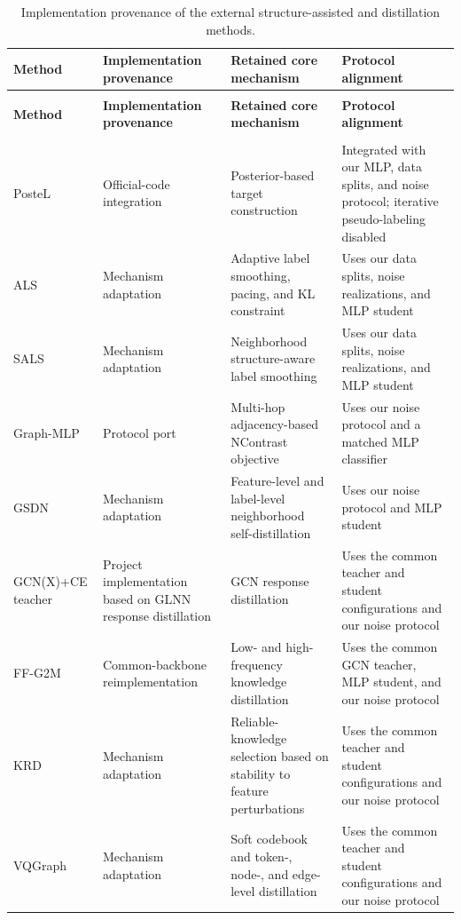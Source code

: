 \documentclass[10pt,letterpaper]{elsarticle}
\newlength{\TableWidth}
\begin{document}
\Needspace{335pt}
\begingroup
\fontsize{9.5}{12}\selectfont
\setlength{\tabcolsep}{3pt}
\renewcommand{\arraystretch}{1.18}
\setlength{\TableWidth}{\dimexpr\linewidth-6\tabcolsep\relax}
\begin{longtable}{@{}>{\raggedright\arraybackslash}p{\dimexpr 0.180000\TableWidth\relax}>{\raggedright\arraybackslash}p{\dimexpr 0.220000\TableWidth\relax}>{\raggedright\arraybackslash}p{\dimexpr 0.240000\TableWidth\relax}>{\raggedright\arraybackslash}p{\dimexpr 0.360000\TableWidth\relax}@{}}
\caption{Implementation provenance of the external structure-assisted and distillation methods.}\label{tab:G.1}\\
\toprule
\textbf{Method} & \textbf{Implementation provenance} & \textbf{Retained core mechanism} & \textbf{Protocol alignment} \\
\midrule\endfirsthead
\multicolumn{4}{l}{\small\itshape Table \thetable{} (continued)}\\
\toprule
\textbf{Method} & \textbf{Implementation provenance} & \textbf{Retained core mechanism} & \textbf{Protocol alignment} \\
\midrule\endhead
\midrule\multicolumn{4}{r}{\small\itshape Continued on the next page}\\\endfoot
\bottomrule\endlastfoot
PosteL & Official-code integration & Posterior-based target construction & Integrated with our MLP, data splits, and noise protocol; iterative pseudo-labeling disabled \\
ALS & Mechanism adaptation & Adaptive label smoothing, pacing, and KL constraint & Uses our data splits, noise realizations, and MLP student \\
SALS & Mechanism adaptation & Neighborhood structure-aware label smoothing & Uses our data splits, noise realizations, and MLP student \\
Graph-MLP & Protocol port & Multi-hop adjacency-based NContrast objective & Uses our noise protocol and a matched MLP classifier \\
GSDN & Mechanism adaptation & Feature-level and label-level neighborhood self-distillation & Uses our noise protocol and MLP student \\
GCN(X)+CE teacher & Project implementation based on GLNN response distillation & GCN response distillation & Uses the common teacher and student configurations and our noise protocol \\
FF-G2M & Common-backbone reimplementation & Low- and high-frequency knowledge distillation & Uses the common GCN teacher, MLP student, and our noise protocol \\
KRD & Mechanism adaptation & Reliable-knowledge selection based on stability to feature perturbations & Uses the common teacher and student configurations and our noise protocol \\
VQGraph & Mechanism adaptation & Soft codebook and token-, node-, and edge-level distillation & Uses the common teacher and student configurations and our noise protocol \\
\end{longtable}
\endgroup
\end{document}
